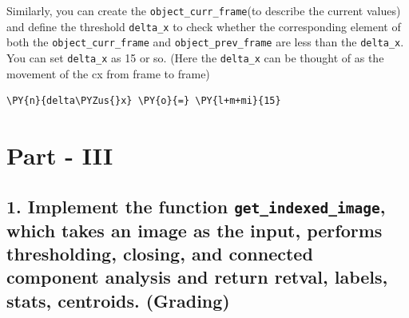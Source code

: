 \documentclass[a4paper,11pt]{article}%
\begin{document}
    Similarly, you can create the \texttt{object\_curr\_frame}(to describe
the current values) and define the threshold \texttt{delta\_x} to check
whether the corresponding element of both the
\texttt{object\_curr\_frame} and \texttt{object\_prev\_frame} are less
than the \texttt{delta\_x}. You can set \texttt{delta\_x} as 15 or so.
(Here the \texttt{delta\_x} can be thought of as the movement of the cx
from frame to frame)

    \begin{tcolorbox}[breakable, size=fbox, boxrule=1pt, pad at break*=1mm,colback=cellbackground, colframe=cellborder]
\begin{Verbatim}[commandchars=\\\{\}]
\PY{n}{delta\PYZus{}x} \PY{o}{=} \PY{l+m+mi}{15}
\end{Verbatim}
\end{tcolorbox}

    \hypertarget{part---iii}{%
\section{Part - III}\label{part---iii}}

\hypertarget{implement-the-function-get_indexed_image-which-takes-an-image-as-the-input-performs-thresholding-closing-and-connected-component-analysis-and-return-retval-labels-stats-centroids.-grading}{%
\subsection{\texorpdfstring{1. Implement the function
\texttt{get\_indexed\_image}, which takes an image as the input,
performs thresholding, closing, and connected component analysis and
return retval, labels, stats, centroids.
(Grading)}{1. Implement the function get\_indexed\_image, which takes an image as the input, performs thresholding, closing, and connected component analysis and return retval, labels, stats, centroids. (Grading)}}\label{implement-the-function-get_indexed_image-which-takes-an-image-as-the-input-performs-thresholding-closing-and-connected-component-analysis-and-return-retval-labels-stats-centroids.-grading}}
\end{document}
